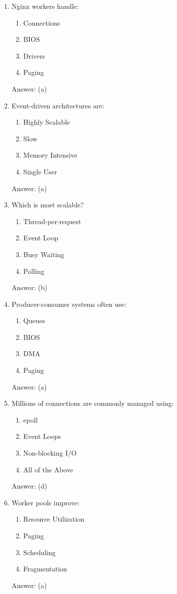 \begin{enumerate}
\item Nginx workers handle:
\begin{enumerate}[label=(\alph*)]
\item Connections
\item BIOS
\item Drivers
\item Paging
\end{enumerate}
Answer: (a)

\item Event-driven architectures are:
\begin{enumerate}[label=(\alph*)]
\item Highly Scalable
\item Slow
\item Memory Intensive
\item Single User
\end{enumerate}
Answer: (a)

\item Which is most scalable?
\begin{enumerate}[label=(\alph*)]
\item Thread-per-request
\item Event Loop
\item Busy Waiting
\item Polling
\end{enumerate}
Answer: (b)

\item Producer-consumer systems often use:
\begin{enumerate}[label=(\alph*)]
\item Queues
\item BIOS
\item DMA
\item Paging
\end{enumerate}
Answer: (a)

\item Millions of connections are commonly managed using:
\begin{enumerate}[label=(\alph*)]
\item epoll
\item Event Loops
\item Non-blocking I/O
\item All of the Above
\end{enumerate}
Answer: (d)

\item Worker pools improve:
\begin{enumerate}[label=(\alph*)]
\item Resource Utilization
\item Paging
\item Scheduling
\item Fragmentation
\end{enumerate}
Answer: (a)


\end{enumerate}
